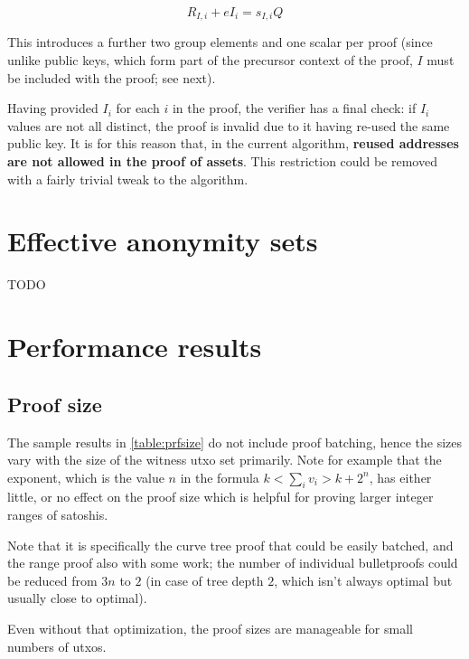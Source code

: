 \documentclass[10pt,a4paper]{article}
\begin{document}
$$ R_{I, i} + eI_i = s_{I, i} Q $$

This introduces a further two group elements and one scalar per proof (since unlike public keys, which form part of the precursor context of the proof, $I$ must be included with the proof; see next).

\vspace{5 pt}

Having provided $I_i$ for each $i$ in the proof, the verifier has a final check: if $I_i$ values are not all distinct, the proof is invalid due to it having re-used the same public key. It is for this reason that, in the current algorithm, \textbf{reused addresses are not allowed in the proof of assets}. This restriction could be removed with a fairly trivial tweak to the algorithm.

\section{Effective anonymity sets}

TODO

\section{Performance results}

\subsection{Proof size}

The sample results in \ref{table:prfsize} do not include proof batching, hence the sizes vary with the size of the witness utxo set primarily. Note for example that the exponent, which is the value $n$ in the formula $k < \sum_i v_i > k + 2^n$, has either little, or no effect on the proof size which is helpful for proving larger integer ranges of satoshis.

\vspace{5 pt}

Note that it is specifically the curve tree proof that could be easily batched, and the range proof also with some work; the number of individual bulletproofs could be reduced from $3n$ to $2$ (in case of tree depth $2$, which isn't always optimal but usually close to optimal).

\vspace{5 pt}

Even without that optimization, the proof sizes are manageable for small numbers of utxos.
\end{document}
